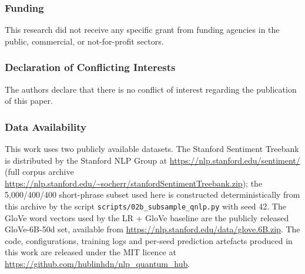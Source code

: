 \documentclass[11pt, a4paper]{article}
\begin{document}
\subsubsection*{Funding}

This research did not receive any specific grant from funding
agencies in the public, commercial, or not-for-profit sectors.

\subsubsection*{Declaration of Conflicting Interests}

The authors declare that there is no conflict of interest regarding
the publication of this paper.

\subsubsection*{Data Availability}

This work uses two publicly available datasets. The Stanford
Sentiment Treebank \citep{socher2013} is distributed by the Stanford
NLP Group at \url{https://nlp.stanford.edu/sentiment/} (full corpus
archive \url{https://nlp.stanford.edu/~socherr/stanfordSentimentTreebank.zip});
the 5{,}000/400/400 short-phrase subset used here is constructed
deterministically from this archive by the script
\texttt{scripts/02b\_subsample\_qnlp.py} with seed 42. The GloVe word
vectors used by the LR + GloVe baseline \citep{pennington2014} are
the publicly released GloVe-6B-50d set, available from
\url{https://nlp.stanford.edu/data/glove.6B.zip}. The code,
configurations, training logs and per-seed prediction artefacts
produced in this work are released under the MIT licence at
\url{https://github.com/hublinhdn/nlp_quantum_hub}.


\end{document}
